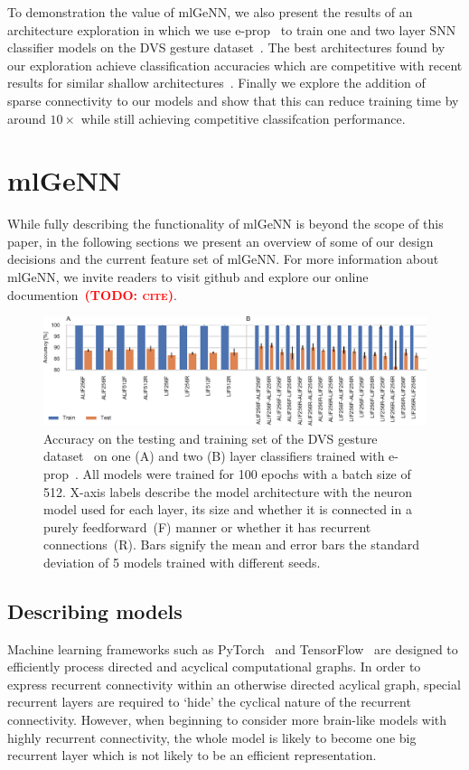 \documentclass[sigconf]{acmart}
\newcommand{\todo}[1]{\textbf{\textsc{\textcolor{red}{(TODO: #1)}}}}
\begin{document}
To demonstration the value of mlGeNN, we also present the results of an architecture exploration in which we use e-prop~\citep{Bellec2020} to train one and two layer SNN classifier models on the DVS gesture dataset~\citep{amir_low_2017}.
The best architectures found by our exploration achieve classification accuracies which are competitive with recent results for similar shallow architectures~\citep{subramoney2022egru,yin2021accurate}.
Finally we explore the addition of sparse connectivity to our models and show that this can reduce training time by around $10\times$ while still achieving competitive classifcation performance.

\section{mlGeNN}
While fully describing the functionality of mlGeNN is beyond the scope of this paper, in the following sections we present an overview of some of our design decisions and the current feature set of mlGeNN.
For more information about mlGeNN, we invite readers to visit github and explore our online documention~\todo{cite}.

\begin{figure}[t]
  \centering
  \includegraphics{figures/dense_accuracy.pdf}
  \caption{Accuracy on the testing and training set of the DVS gesture dataset~\citep{amir_low_2017} on one (A) and two (B) layer classifiers trained with e-prop~\citep{Bellec2020}.
  All models were trained for 100 epochs with a batch size of 512.
  X-axis labels describe the model architecture with the neuron model used for each layer, its size and whether it is connected in a purely feedforward~(F) manner or whether it has recurrent connections~(R).
  Bars signify the mean and error bars the standard deviation of 5 models trained with different seeds.}
  \label{fig:dense_accuracy}
\end{figure}

\subsection{Describing models}
Machine learning frameworks such as PyTorch~\citep{paszke2019pytorch} and TensorFlow~\citep{TensorFlow} are designed to efficiently process directed and acyclical computational graphs.
In order to express recurrent connectivity within an otherwise directed acylical graph, special recurrent layers are required to `hide' the cyclical nature of the recurrent connectivity.
However, when beginning to consider more brain-like models with highly recurrent connectivity, the whole model is likely to become one big recurrent layer which is not likely to be an efficient representation.
\end{document}
